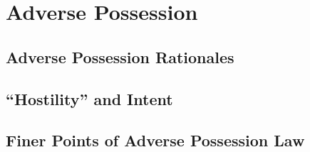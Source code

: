 \chapter{Adverse Possession}



\section{Adverse Possession Rationales}





\begin{questions}



\end{questions}



\section{``Hostility'' and Intent}







\begin{questions}

\end{questions}

\section{Finer Points of Adverse Possession Law}


